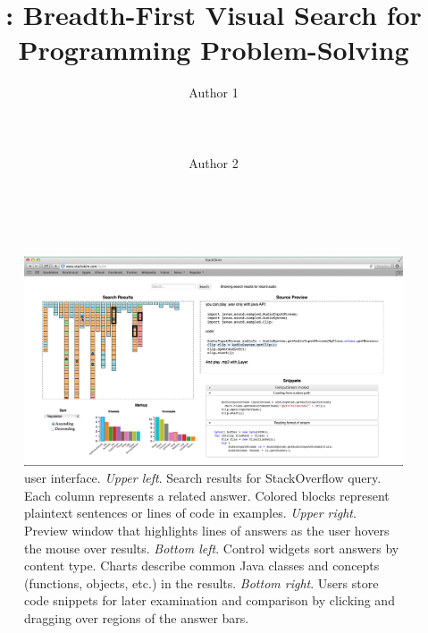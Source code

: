 \documentclass{sigchi}
\begin{document}
\title{\systemname{}: Breadth-First Visual Search for Programming Problem-Solving}

\author{
  \alignauthor Author 1\\
    \\
    \\
    \\
  \alignauthor Author 2\\
    \\
    \\
}
\fi

\makeatletter
\let\@oldmaketitle\@maketitle
\renewcommand{\@maketitle}{\@oldmaketitle}
\makeatother

\maketitle





\begin{figure}
 \centering
 \includegraphics[width=.9\linewidth]{figures/ui_full}
 \caption{\systemname{} user interface. 
 \emph{Upper left}.
 Search results for StackOverflow query.
 Each column represents a related answer.
 Colored blocks represent plaintext sentences or lines of code in examples.
 \emph{Upper right}.
 Preview window that highlights lines of answers as the user hovers the mouse over results.
 \emph{Bottom left}.
 Control widgets sort answers by content type.
 Charts describe common Java classes and concepts (functions, objects, etc.) in the results.
 \emph{Bottom right}.
 Users store code snippets for later examination and comparison by clicking and dragging over regions of the answer bars.
 }
 \label{fig:user_interface}
\end{figure}
\end{document}
